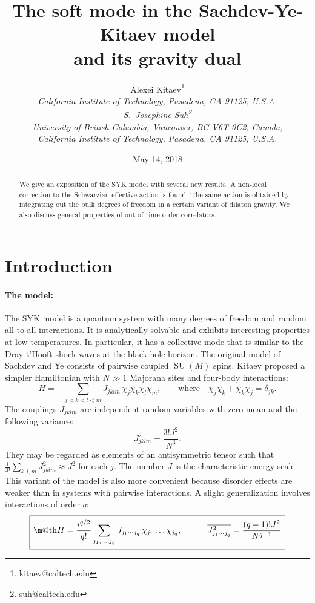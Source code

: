 \documentclass[12pt]{article}
\title {The soft mode in the Sachdev-Ye-Kitaev model\\ and its gravity dual}
\author{Alexei Kitaev\footnote{kitaev@caltech.edu}\\
\normalsize\it California Institute of Technology, Pasadena, CA 91125, U.S.A.
\\[5pt]
S.\ Josephine Suh\footnote{suh@caltech.edu}\\
\normalsize\it University of British Columbia, Vancouver, BC V6T 0C2, Canada,\\
\normalsize\it California Institute of Technology, Pasadena, CA 91125, U.S.A.\vspace{0.5cm}}
\date{May 14, 2018}
\makeatletter
\newcommand*{\wideboxed}[1]{\setlength{\fboxsep}{1ex}%
  \fbox{\m@th$\displaystyle#1$}}
\DeclareMathOperator{\SU}{SU}
\makeatother
\begin{document}
\setcounter{tocdepth}{2}

\maketitle
\begin{abstract}
We give an exposition of the SYK model with several new results. A non-local correction to the Schwarzian effective action is found. The same action is obtained by integrating out the bulk degrees of freedom in a certain variant of dilaton gravity. We also discuss general properties of out-of-time-order correlators.
\end{abstract}

\newpage
\tableofcontents
\newpage

\section{Introduction}

\paragraph{The model:}
The SYK model is a quantum system with many degrees of freedom and random all-to-all interactions. It is analytically solvable and exhibits interesting properties at low temperatures. In particular, it has a collective mode that is similar to the Dray-t'Hooft shock waves at the black hole horizon. The original model of Sachdev and Ye \cite{SaYe93} consists of pairwise coupled $\SU(M)$ spins. Kitaev \cite{Kit.KITP.1,Kit.KITP} proposed a simpler Hamiltonian with $N\gg 1$ Majorana sites and four-body interactions:
\begin{equation}\label{H_SYK4}
H = -\sum_{j<k<l<m}J_{jklm}\, \chi_j\chi_k\chi_l\chi_m,
\qquad \text{where}\quad
\chi_j\chi_k+\chi_k\chi_j=\delta_{jk}.
\end{equation}
The couplings $J_{jklm}$ are independent random variables with zero mean and the following variance:
\begin{equation}
\overline{J_{jklm}^2}=\frac{3!J^2}{N^3}.
\end{equation}
They may be regarded as elements of an antisymmetric tensor such that $\frac{1}{3!}\sum_{k,l,m}J_{jklm}^2\approx J^2$ for each $j$. The number $J$ is the characteristic energy scale. This variant of the model is also more convenient because disorder effects are weaker than in systems with pairwise interactions. A slight generalization involves interactions of order $q$:
\begin{equation}\label{H_SYK}
\wideboxed{
H = \frac{i^{q/2}}{q!}\sum_{j_1,\dots,j_q}J_{j_1\cdots j_q}\,
\chi_{j_1}\dots\chi_{j_q},
\qquad\quad
\overline{J_{j_1\cdots j_q}^2}=\frac{(q-1)!J^2}{N^{q-1}}
}
\end{equation}
\end{document}
